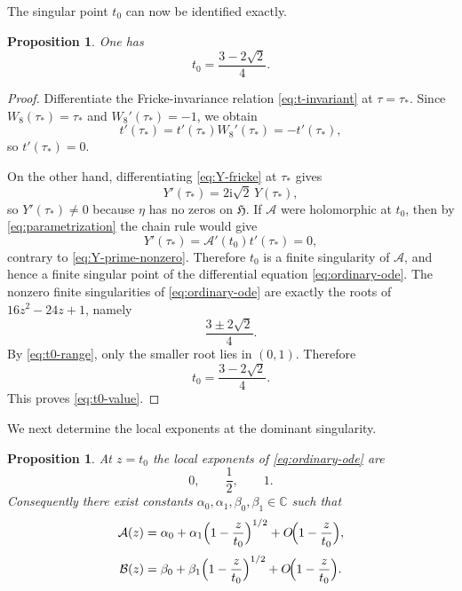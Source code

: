 \documentclass[11pt]{amsart}
\numberwithin{equation}{section}
\theoremstyle{plain}
\newtheorem{proposition}[theorem]{Proposition}
\theoremstyle{definition}
\theoremstyle{remark}
\newcommand{\C}{\mathbb{C}}
\newcommand{\Hh}{\mathfrak{H}}
\newcommand{\ii}{\mathrm{i}}
\begin{document}
The singular point $t_0$ can now be identified exactly.

\begin{proposition}\label{prop:t0-value}
One has
\begin{equation}\label{eq:t0-value}
t_0=\frac{3-2\sqrt2}{4}.
\end{equation}
\end{proposition}

\begin{proof}
Differentiate the Fricke-invariance relation \eqref{eq:t-invariant} at $\tau=\tau_*$. Since $W_8(\tau_*)=\tau_*$ and $W_8'(\tau_*)=-1$, we obtain
\[
t'(\tau_*)=t'(\tau_*)W_8'(\tau_*)=-t'(\tau_*),
\]
so $t'(\tau_*)=0$.

On the other hand, differentiating \eqref{eq:Y-fricke} at $\tau_*$ gives
\begin{equation}\label{eq:Y-prime-nonzero}
Y'(\tau_*)=2\ii\sqrt2\,Y(\tau_*),
\end{equation}
so $Y'(\tau_*)\neq 0$ because $\eta$ has no zeros on $\Hh$. If $\mathcal A$ were holomorphic at $t_0$, then by \eqref{eq:parametrization} the chain rule would give
\[
Y'(\tau_*)=\mathcal A'(t_0)t'(\tau_*)=0,
\]
contrary to \eqref{eq:Y-prime-nonzero}. Therefore $t_0$ is a finite singularity of $\mathcal A$, and hence a finite singular point of the differential equation \eqref{eq:ordinary-ode}. The nonzero finite singularities of \eqref{eq:ordinary-ode} are exactly the roots of $16z^2-24z+1$, namely
\[
\frac{3\pm 2\sqrt2}{4}.
\]
By \eqref{eq:t0-range}, only the smaller root lies in $(0,1)$. Therefore
\[
t_0=\frac{3-2\sqrt2}{4}.
\]
This proves \eqref{eq:t0-value}.
\end{proof}

We next determine the local exponents at the dominant singularity.

\begin{proposition}\label{prop:local-exponents}
At $z=t_0$ the local exponents of \eqref{eq:ordinary-ode} are
\[
0,\qquad \frac12,\qquad 1.
\]
Consequently there exist constants $\alpha_0,\alpha_1,\beta_0,\beta_1\in\C$ such that
\begin{equation}\label{eq:A-local}
\mathcal A(z)=\alpha_0+\alpha_1\Bigl(1-\frac{z}{t_0}\Bigr)^{1/2}+O\!\Bigl(1-\frac{z}{t_0}\Bigr),
\end{equation}
\begin{equation}\label{eq:B-local}
\mathcal B(z)=\beta_0+\beta_1\Bigl(1-\frac{z}{t_0}\Bigr)^{1/2}+O\!\Bigl(1-\frac{z}{t_0}\Bigr).
\end{equation}
\end{proposition}
\end{document}

